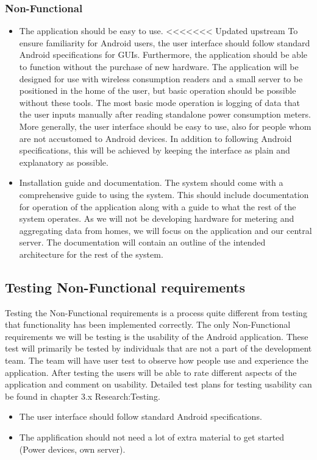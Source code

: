 \subsubsection{Non-Functional}

\begin{itemize}
\item The application should be easy to use.
<<<<<<< Updated upstream
To ensure familiarity for Android users, the user interface should follow standard Android specifications for GUIs. 
Furthermore, the application should be able to function without the purchase of new hardware. The application will be
designed for use with wireless consumption readers and a small server to be positioned in the home of the user, but basic
operation should be possible without these tools. The most basic mode operation is logging of data that 
the user inputs manually after reading standalone power consumption meters. 
More generally, the user interface should be easy to use, also for people whom are not accustomed to Android devices. In 
addition to following Android specifications, this will be achieved by keeping the interface as plain and explanatory as 
possible.
\end{itemize}

\begin{itemize}
\item Installation guide and documentation.
The system should come with a comprehensive guide to using the system. This should include documentation for operation of the
application along with a guide to what the rest of the system operates. As we will not be developing hardware for metering and 
aggregating data from homes, we will focus on the application and our central server. The documentation will contain an outline 
of the intended architecture for the rest of the system.
\end{itemize}

\subsection{Testing Non-Functional requirements}
Testing the Non-Functional requirements is a process quite different from testing that functionality has been implemented correctly.
The only Non-Functional requirements we will be testing is the usability of the Android application. These test will primarily be 
tested by individuals that are not a part of the development team. The team will have user test to observe how people use and experience 
the application. After testing the users will be able to rate different aspects of the application and comment on usability. Detailed 
test plans for testing usability can be found in chapter 3.x Research:Testing.

\begin{itemize}
\item The user interface should follow standard Android specifications. 
\item The applification should not need a lot of extra material to get started (Power devices, own server).
\end{itemize}
